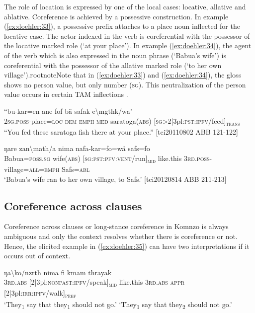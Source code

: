 \documentclass[output=paper]{langscibook}
\begin{document}
The role of location is expressed by one of the local cases: locative, allative and ablative. Coreference is achieved by a possessive construction. In example (\ref{ex:doehler:33}), a possessive prefix attaches to a place noun inflected for the locative case. The actor indexed in the verb is coreferential with the possessor of the locative marked role (`at your place'). In example (\ref{ex:doehler:34}), the agent of the verb which is also expressed in the noun phrase (`Babua's wife') is coreferential with the possessor of the allative marked role (`to her own village').\textsc{f}ootnote{Note that in (\ref{ex:doehler:33}) and (\ref{ex:doehler:34}), the gloss shows no person value, but only number (\textsc{sg}). This neutralization of the person value occurs in certain TAM inflections \citep[207]{Doehler2018}.}


\ea
	\gll ``{bu-kar=en} {ane} {fof} {bä} {safak} {e\textbackslash{mgthk}/wa}"\\
	\textsc{2sg}.\textsc{poss}-place=\textsc{loc}{} \textsc{dem}{} \textsc{emph}{} \textsc{med}{} saratoga(\textsc{abs}) [\textsc{sg}>2|3pl:\textsc{pst}:\textsc{ipfv}/feed]\textsubscript{\textsc{trans}}\\
	\glt ``You fed these saratoga fish there at your place.'' [tci20110802 ABB 121-122]
	\label{ex:doehler:33}
\z


\ea
	 {ŋare} {zan\textbackslash{math}/a} {nima} {nafa-kar=fo=wä} {safs=fo}\\
	Babua=\textsc{poss}.\textsc{sg}{} wife(\textsc{abs}) [\textsc{sg}:\textsc{pst}:\textsc{pfv}:\textsc{vent}/run]\textsubscript{\textsc{mid}} like.this \textsc{3rd}.\textsc{poss}-village=\textsc{all}=\textsc{emph}{} Safs=\textsc{abl}\\
	\glt `Babua's wife ran to her own village, to Safs.' [tci20120814 ABB 211-213] %
	\label{ex:doehler:34}
	\z

\subsection{Coreference across clauses}\label{longstance}
Coreference across clauses or long-stance coreference in Komnzo is always ambiguous and only the context resolves whether there is coreference or not. Hence, the elicited example in (\ref{ex:doehler:35}) can have two interpretations if it occurs out of context.


	\ea
	 {ŋa\textbackslash{ko}/nzrth} {nima} {fi} {kmam} {thrayak}\\
	\textsc{3rd}.\textsc{abs}{} [2|3pl:\textsc{nonpast}:\textsc{ipfv}/speak]\textsubscript{\textsc{mid}} like.this \textsc{3rd}.\textsc{abs}{} \textsc{appr}{} [2|3pl:\textsc{irr}:\textsc{ipfv}/walk]\textsubscript{\textsc{pref}}\\
	\glt `They\textsubscript{1} say that they\textsubscript{1} should not go.'
	\glt `They\textsubscript{1} say that they\textsubscript{2} should not go.'
	\label{ex:doehler:35}
\z
\end{document}
